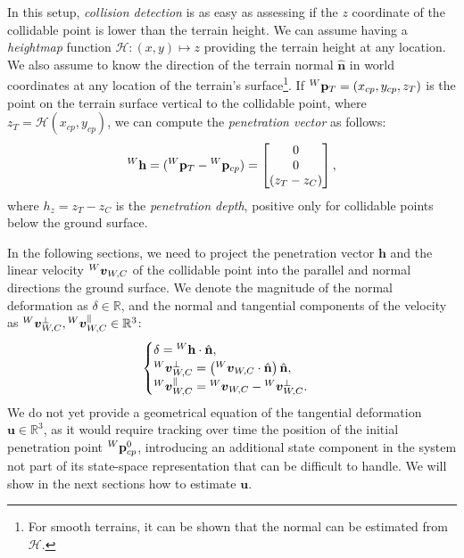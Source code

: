 In this setup, \emph{collision detection} is as easy as assessing if the $z$ coordinate of the collidable point is lower than the terrain height.
We can assume having a \emph{heightmap} function $\mathcal{H}: (x, y) \mapsto z$ providing the terrain height at any location.
We also assume to know the direction of the terrain normal $\hat{\mathbf{n}}$ in world coordinates at any location of the terrain's surface\footnote{For smooth terrains, it can be shown that the normal can be estimated from $\mathcal{H}$.}.
If $\pos[W]_T = (x_{cp}, y_{cp}, z_T)$ is the point on the terrain surface vertical to the collidable point, where $z_T = \mathcal{H}(x_{cp}, y_{cp})$,
we can compute the \emph{penetration vector} as follows:
%
\begin{equation*}
    {}^W\mathbf{h} = (\pos[W]_T - \pos[W]_{cp}) = 
    \begin{bmatrix}
    0 \\ 0 \\ (z_T - z_C)
    \end{bmatrix}
    ,
\end{equation*}
%
where $h_z = z_T - z_C$ is the \emph{penetration depth}, positive only for collidable points below the ground surface.

In the following sections, we need to project the penetration vector $\mathbf{h}$ and the linear velocity $\vellin[W]_{W, C}$ of the collidable point into the parallel and normal directions \wrt the ground surface.
We denote the magnitude of the normal deformation as $\delta \in \mathbb{R}$, and the normal and tangential components of the velocity as $\vellin[W]^{\perp}_{W, C}, \vellin[W]^{\parallel}_{W, C} \in \mathbb{R}^3$:
%
\begin{align*}
    \begin{cases}
        \delta = {}^W\mathbf{h} \cdot \hat{\mathbf{n}}, \\
        \vellin[W]^{\perp}_{W, C} = \left(\vellin[W]_{W, C} \cdot \hat{\mathbf{n}}\right) \hat{\mathbf{n}}, \\
    \vellin[W]^{\parallel}_{W, C} = \vellin[W]_{W, C} - \vellin[W]^{\perp}_{W, C}
    .
    \end{cases}
\end{align*}
%
We do not yet provide a geometrical equation of the tangential deformation $\mathbf{u} \in \mathbb{R}^3$, as it would require tracking over time the position of the initial penetration point $\pos[W]^0_{cp}$, introducing an additional state component in the system not part of its state-space representation that can be difficult to handle.
We will show in the next sections how to estimate $\mathbf{u}$.

